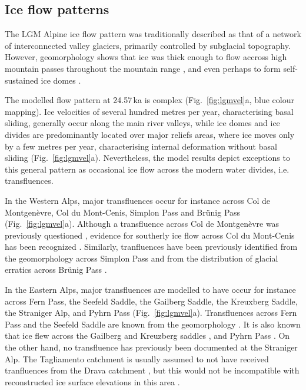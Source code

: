 \documentclass[tc, manuscript]{copernicus}
\begin{document}
\subsection{Ice flow patterns}
\label{sec:flow}

    The LGM Alpine ice flow pattern was traditionally described as that of a
    network of interconnected valley glaciers, primarily controlled by
    subglacial topography. However, geomorphology shows that ice was thick
    enough to flow accross high mountain passes throughout the mountain range
    \citep[e.g.,][]{Onde.1938, Penck.Bruckner.1909, Jackli.1962, Husen.1985,
    Husen.2011, Kelly.etal.2004, Coutterand.2010}, and even perhaps to form
    self-sustained ice domes \citep{Florineth.1998, Florineth.Schluchter.1998,
    Kelly.etal.2004, Bini.etal.2009}.

    The modelled flow pattern at 24.57\,ka is complex (Fig.~\ref{fig:lgmvel}a,
    blue colour mapping). Ice velocities of several hundred metres per year,
    characterising basal sliding, generally occur along the main river valleys,
    while ice domes and ice divides are predominantly located over major
    reliefs areas, where ice moves only by a few metres per year,
    characterising internal deformation without basal sliding
    (Fig.~\ref{fig:lgmvel}a). Nevertheless, the model results depict exceptions
    to this general pattern as occasional ice flow across the modern water
    divides, i.e. transfluences.

    In the Western Alps, major transfluences occur for instance across Col de
    Montgenèvre, Col du Mont-Cenis, Simplon Pass and Brünig Pass
    (Fig.~\ref{fig:lgmvel}a). Although a transfluence across Col de Montgenèvre
    was previously questioned \citep[Fig.~2]{Cossart.etal.2012}, evidence for
    southerly ice flow across Col du Mont-Cenis has been recognized
    \citep[Fig.~3.18, p.~284]{Onde.1938, Coutterand.2010}. Similarly,
    tranfluences have been previously identified from the geomorphology across
    Simplon Pass \citep{Kelly.etal.2004} and from the distribution of glacial
    erratics across Brünig Pass \citep{Jackli.1962}.

    In the Eastern Alps, major transfluences are modelled to have occur for
    instance across Fern Pass, the Seefeld Saddle, the Gailberg Saddle, the
    Kreuxberg Saddle, the Straniger Alp, and Pyhrn Pass
    (Fig.~\ref{fig:lgmvel}a). Transfluences across Fern Pass and the Seefeld
    Saddle are known from the geomorphology
    \citep[Fig.~2.4]{Penck.Bruckner.1909, Husen.2011}. It is also known that
    ice flew across the Gailberg and Kreuzberg saddles \citep{Husen.1985}, and
    Pyhrn Pass \citep[Fig.~\ref{fig:lgmvel}a; cf.][Fig.~2.5]{Husen.2011}.
    On the other hand, no transfluence has previously been documented at the
    Straniger Alp. The Tagliamento catchment is usually assumed to not have
    received tranfluences from the Drava catchment \citep{Monegato.etal.2007},
    but this would not be incompatible with reconstructed ice surface
    elevations in this area \citep{Husen.1987}.
\end{document}
